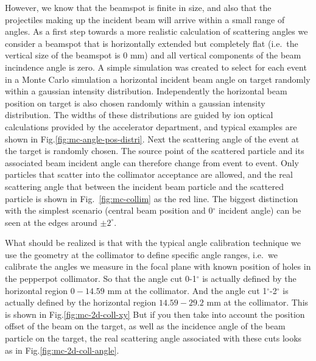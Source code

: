 \documentclass[11pt]{report}
\begin{document}



However, we know that the beamspot is finite in size, and also that the projectiles making up the incident beam will arrive within a small range of angles.  As a first step towards a more realistic calculation of scattering angles we consider a beamspot that is horizontally extended but completely flat
(i.e.~the vertical size of the beamspot is 0 mm) and all vertical components of the beam incindence angle is zero.
A simple simulation was created to 
select for each event in a Monte Carlo simulation a horizontal incident beam angle on target randomly within a gaussian intensity distribution.
Independently the horizontal beam position on target is also chosen randomly within a gaussian intensity distribution.
The widths of these distributions are guided by ion optical calculations provided by the accelerator department, and typical examples are shown in Fig.\ref{fig:mc-angle-pos-distri}.
Next the scattering angle of the event at the target is randomly chosen. The source point of the scattered particle and its associated beam incident angle can therefore change from event to event. 
Only particles that scatter into the collimator acceptance are allowed, and the real scattering angle that between the incident beam particle and the scattered particle is shown in Fig.~\ref{fig:mc-collim}
as the red line. The biggest distinction with the simplest scenario (central beam position and 
0$^{\circ}$ incident angle) can be seen at the edges around $\pm2^{\circ}$.


What should be realized is that with the typical angle calibration technique we use the geometry at the collimator to define specific angle ranges, i.e.~we calibrate the angles we measure in the focal plane with known position of holes in the pepperpot collimator.
So that the angle cut 0-1$^{\circ}$ is actually defined by the horizontal region $0 - 14.59$ mm at the collimator. And the angle cut 1$^{\circ}$-2$^{\circ}$ is actually defined by the horizontal region  $14.59 - 29.2$ mm at the collimator.  This is shown in Fig.\ref{fig:mc-2d-coll-xy}
But if you then take into account the position offset of the beam on the target, as well as the incidence angle of the beam particle on the target, the real scattering angle associated with these cuts looks as in Fig.\ref{fig:mc-2d-coll-angle}.
\end{document}
